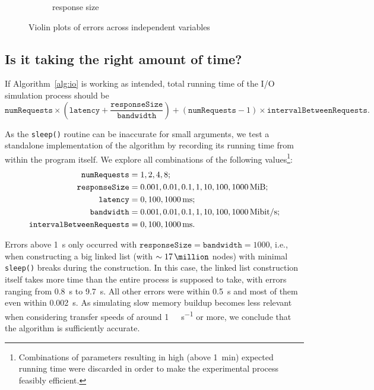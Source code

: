 \documentclass{article}
\begin{document}
\begin{figure}
\begin{subfigure}[t]{0.49\textwidth}
    \caption{response size}
    \label{fig:posterior_violin_response}
  \end{subfigure}
  \caption{Violin plots of errors across independent variables}
  \label{fig:posterior_violins}
\end{figure}

\subsection{Is it taking the right amount of time?}

If Algorithm~\ref{alg:io} is working as intended, total running time of the I/O
simulation process should be
\[
  \texttt{numRequests} \times \left( \texttt{latency} +
  \frac{\texttt{responseSize}}{\texttt{bandwidth}} \right) +
(\texttt{numRequests} - 1) \times \texttt{intervalBetweenRequests}.
\]

As the \texttt{sleep()} routine can be inaccurate for small arguments, we test
a standalone implementation of the algorithm by recording its running time from
within the program itself. We explore all combinations of the following
values\footnote{Combinations of parameters resulting in high (above
  \SI{1}{\minute}) expected running time were discarded in order to make the
  experimental process feasibly efficient.}:
\begin{align*}
  \texttt{numRequests} &= 1, 2, 4, 8; \\
  \texttt{responseSize} &= 0.001, 0.01, 0.1, 1, 10, 100, \SI{1000}{\mebi\byte}; \\
  \texttt{latency} &= 0, 100, \SI{1000}{\milli\second}; \\
  \texttt{bandwidth} &= 0.001, 0.01, 0.1, 1, 10, 100, \SI[per-mode=symbol]{1000}{\mebi\bit\per\second}; \\
  \texttt{intervalBetweenRequests} &= 0, 100, \SI{1000}{\milli\second}.
\end{align*}

Errors above \SI{1}{\second} only occurred with $\texttt{responseSize} =
\texttt{bandwidth} = 1000$, i.e., when constructing a big linked list (with
$\sim \SI{17}{\million}$ nodes) with minimal \texttt{sleep()} breaks during the
construction. In this case, the linked list construction itself takes more
time than the entire process is supposed to take, with errors ranging from
\SI{0.8}{\second} to \SI{9.7}{\second}. All other errors were within
\SI{0.5}{\second} and most of them even within \SI{0.002}{\second}. As
simulating slow memory buildup becomes less relevant when considering transfer
speeds of around \SI[per-mode=symbol]{1}{\gibi\bit\per\second} or more, we
conclude that the algorithm is sufficiently accurate.
\end{document}
